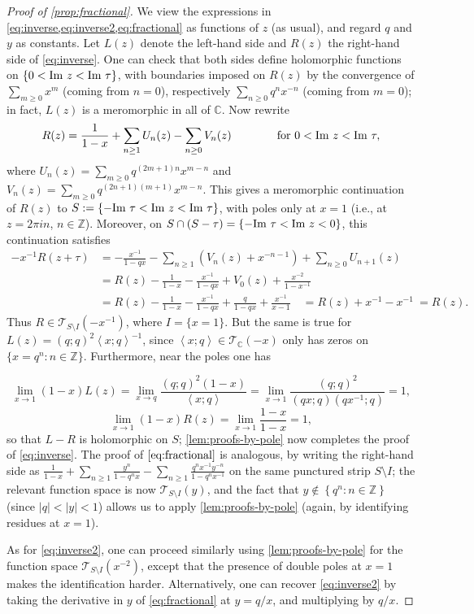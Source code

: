 \documentclass[reqno,11pt]{amsart}
\theoremstyle{definition}
\theoremstyle{remark}
\numberwithin{equation}{section}
\newcommand{\Z}{\mathbb{Z}}
\newcommand{\C}{\mathbb{C}}
\newcommand{\mT}{\mathcal{T}}
\renewcommand{\Im}{\textnormal{Im}\ }
\newcommand{\la}{\left\langle}
\newcommand{\ra}{\right\rangle}
\begin{document}
\begin{proof}[Proof of \cref{prop:fractional}]
We view the expressions in \cref{eq:inverse,eq:inverse2,eq:fractional} as functions of $z$ (as usual), and regard $q$ and $y$ as constants. Let $L(z)$ denote the left-hand side and $R(z)$ the right-hand side of \cref{eq:inverse}. One can check that both sides define holomorphic functions on $\{0 < \Im z < \Im \tau\}$, with boundaries imposed on $R(z)$ by the convergence of $\sum_{m \ge 0} x^m$ (coming from $n = 0$), respectively $\sum_{n \ge 0} q^n x^{-n}$ (coming from $m = 0$); in fact, $L(z)$ is a meromorphic in all of $\C$. Now rewrite
\[
    R(z) = \frac{1}{1 - x} + \sum_{n \ge 1} U_n(z) - \sum_{n \ge 0} V_n(z)
    \qquad\qquad 
    \text{for } 0 < \Im z < \Im \tau,
\]
where $U_n(z) = \sum_{m \ge 0} q^{(2m+1)n} x^{m-n}$ and $V_n(z) = \sum_{m \ge 0} q^{(2n+1)(m+1)} x^{m-n}$. This gives a meromorphic continuation of $R(z)$ to $S := \{-\Im \tau < \Im z < \Im \tau\}$, with poles only at $x = 1$ (i.e., at $z = 2\pi i n$, $n \in \Z$). Moreover, on $S \cap (S - \tau) = \{-\Im \tau < \Im z < 0\}$, this continuation satisfies
\[
\begin{aligned}
    -x^{-1} R(z + \tau)
    &=
    -\frac{x^{-1}}{1 - qx} - 
    \sum_{n \ge 1} \left(V_n(z) + x^{-n-1}\right)
    +
    \sum_{n \ge 0} U_{n+1}(z)
    \\
    &= R(z) - \frac{1}{1-x} -\frac{x^{-1}}{1 - qx} + V_0(z) + \frac{x^{-2}}{1 - x^{-1}} \\
    &= R(z) - \frac{1}{1-x} -\frac{x^{-1}}{1 - qx} + \frac{q}{1-qx} + \frac{x^{-1}}{x - 1}
    \quad =
    R(z) + x^{-1} - x^{-1} \ = R(z).
\end{aligned}
\]
Thus $R \in \mT_{S \setminus I}\left(-x^{-1}\right)$, where $I = \{x = 1\}$. But the same is true for $L(z) = (q; q)^2 \la x; q\ra^{-1}$, since $\la x; q\ra \in \mT_\C\left(-x\right)$ only has zeros on $\{x = q^n : n \in \Z\}$. Furthermore, near the poles one has

\[
    \lim_{x \to 1} (1 - x) L(z) = \lim_{x \to q} \frac{(q; q)^2 (1 - x)}{\la x; q\ra} 
    = \lim_{x \to 1} \frac{(q; q)^2}{(qx; q)\left(qx^{-1}; q\right)} = 1,
\]
\[
    \lim_{x \to 1} (1 - x) R(z) = \lim_{x \to 1} \frac{1-x}{1-x} = 1,
\]
so that $L - R$ is holomorphic on $S$; \cref{lem:proofs-by-pole} now completes the proof of \cref{eq:inverse}. The proof of $\cref{eq:fractional}$ is analogous, by writing the right-hand side as $\frac{1}{1-x} + \sum_{n \ge 1} \frac{y^n}{1-q^n x} - \sum_{n \ge 1} \frac{q^nx^{-1}y^{-n}}{1-q^n x^{-1}}$ on the same punctured strip $S \setminus I$; the relevant function space is now $\mT_{S\setminus I}(y)$, and the fact that $y \not\in \left\{q^n : n \in \Z\right\}$ (since $|q| < |y| < 1$) allows us to apply \cref{lem:proofs-by-pole} (again, by identifying residues at $x = 1$).

As for \cref{eq:inverse2}, one can proceed similarly using \cref{lem:proofs-by-pole} for the function space $\mT_{S \setminus I}\left(x^{-2}\right)$, except that the presence of double poles at $x = 1$ makes the identification harder. Alternatively, one can recover \cref{eq:inverse2} by taking the derivative in $y$ of \cref{eq:fractional} at $y = q/x$, and multiplying by $q/x$.
\end{proof}
\end{document}
